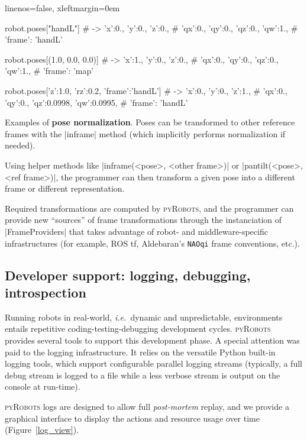 \documentclass[a4paper, 10pt, conference]{ieeeconf}      %
\newcommand{\ie}{{\textit{i.e.\ }}}
\newcommand{\pyRobots}{\textsc{pyRobots}}
\begin{document}
\begin{listing}
    \begin{pythoncode*}{linenos=false, xleftmargin=0em}

    robot.poses["handL"]
    # -> {'x':0., 'y':0., 'z':0., 
    #    'qx':0., 'qy':0., 'qz':0., 'qw':1., 
    #    'frame': 'handL'}

    robot.poses[(1.0, 0.0, 0.0)]
    # -> {'x':1., 'y':0., 'z':0., 
    #    'qx':0., 'qy':0., 'qz':0., 'qw':1., 
    #    'frame': 'map'}

    robot.poses[{'z':1.0, 'rz':0.2, 'frame':'handL'}]
    # -> {'x':0., 'y':0., 'z':1., 
    #    'qx':0., 'qy':0., 'qz':0.0998, 'qw':0.0995, 
    #    'frame': 'handL'}

\end{pythoncode*}
\caption{Examples of \textbf{pose normalization}. Poses can be transformed to
other reference frames with the \python|inframe| method (which implicitly performs
normalization if needed).}
\label{lst:poses}
\end{listing}

Using helper methods like \python|inframe(<pose>, <other frame>)| or
\python|pantilt(<pose>, <ref frame>)|, the programmer can then
transform a given pose into a different frame or different representation.

Required transformations are computed by \pyRobots{}, and the programmer can
provide new ``sources'' of frame transformations through the instanciation of
\python|FrameProviders| that takes advantage of robot- and middleware-specific
infrastructures (for example, ROS {\sc tf}, Aldebaran's {\tt NAOqi} frame
conventions, etc.).

\subsection{Developer support: logging, debugging, introspection}
\label{}

Running robots in real-world, \ie dynamic and unpredictable, environments
entails repetitive coding-testing-debugging development cycles. \pyRobots{}
provides several tools to support this development phase. A special attention
was paid to the logging infrastructure. It relies on the versatile Python
built-in logging tools, which support configurable parallel logging streams
(typically, a full debug stream is logged to a file while a less verbose stream
is output on the console at run-time).

\pyRobots{} logs are designed to allow full \emph{post-mortem} replay, and we
provide a graphical interface to display the actions and resource usage over
time (Figure~\ref{log_view}).
\end{document}
